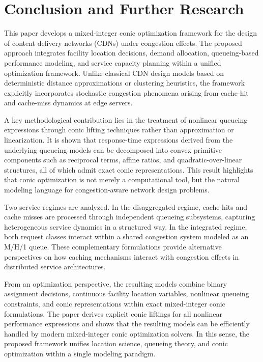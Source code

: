 \documentclass[a4paper,11pt,reqno]{amsart}
\begin{document}
\section{Conclusion and Further Research}\label{sec:conclusion}

This paper develops a mixed-integer conic optimization framework for the design of content delivery networks (CDNs) under congestion effects. The proposed approach integrates facility location decisions, demand allocation, queueing-based performance modeling, and service capacity planning within a unified optimization framework. Unlike classical CDN design models based on deterministic distance approximations or clustering heuristics, the framework explicitly incorporates stochastic congestion phenomena arising from cache-hit and cache-miss dynamics at edge servers.

A key methodological contribution lies in the treatment of nonlinear queueing expressions through conic lifting techniques rather than approximation or linearization. It is shown that response-time expressions derived from the underlying queueing models can be decomposed into convex primitive components such as reciprocal terms, affine ratios, and quadratic-over-linear structures, all of which admit exact conic representations. This result highlights that conic optimization is not merely a computational tool, but the natural modeling language for congestion-aware network design problems.

Two service regimes are analyzed. In the disaggregated regime, cache hits and cache misses are processed through independent queueing subsystems, capturing heterogeneous service dynamics in a structured way. In the integrated regime, both request classes interact within a shared congestion system modeled as an {\rm M/H/1} queue. These complementary formulations provide alternative perspectives on how caching mechanisms interact with congestion effects in distributed service architectures.

From an optimization perspective, the resulting models combine binary assignment decisions, continuous facility location variables, nonlinear queueing constraints, and conic representations within exact mixed-integer conic formulations. The paper derives explicit conic liftings for all nonlinear performance expressions and shows that the resulting models can be efficiently handled by modern mixed-integer conic optimization solvers. In this sense, the proposed framework unifies location science, queueing theory, and conic optimization within a single modeling paradigm.
\end{document}
